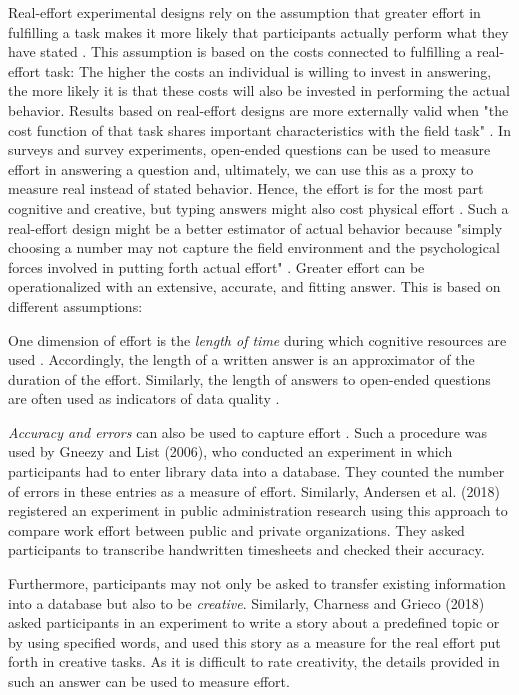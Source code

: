 \documentclass{article}
\begin{document}
Real-effort experimental designs rely on the assumption that greater effort in fulfilling a task makes it more likely that participants actually perform what they have stated \parencite{Dutcher2015}. This assumption is based on the costs connected to fulfilling a real-effort task: The higher the costs an individual is willing to invest in answering, the more likely it is that these costs will also be invested in performing the actual behavior. Results based on real-effort designs are more externally valid when "the cost function of that task shares important characteristics with the field task" \parencite[pp. 3][]{Dutcher2015}. In surveys and survey experiments, open-ended questions can be used to measure effort in answering a question and, ultimately, we can use this as a proxy to measure real instead of stated behavior. Hence, the effort is for the most part cognitive and creative, but typing answers might also cost physical effort \parencite[pp. 75][]{Charness2018}. Such a real-effort design might be a better estimator of actual behavior because "simply choosing a number may not capture the field environment and the psychological forces involved in putting forth actual effort" \parencite[pp. 75][]{Charness2018}. Greater effort can be operationalized with an extensive, accurate, and fitting answer. This is based on different assumptions: 

One dimension of effort is the \emph{length of time} during which cognitive resources are used \parencite{Christensen-Szalanski1980}. Accordingly, the length of a written answer is an approximator of the duration of the effort. Similarly, the length of answers to open-ended questions are often used as indicators of data quality \parencite[pp. 350][]{Galesic2009}. 

\emph{Accuracy and errors} can also be used to capture effort \parencite[pp. 78][]{Charness2018}. Such a procedure was used by Gneezy and List (2006), who conducted an experiment in which participants had to enter library data into a database. They counted the number of errors in these entries as a measure of effort. Similarly, Andersen et al. (2018) registered an experiment in public administration research using this approach to compare work effort between public and private organizations. They asked participants to transcribe handwritten timesheets and checked their accuracy. 

Furthermore, participants may not only be asked to transfer existing information into a database but also to be \emph{creative}. Similarly, Charness and Grieco (2018) asked participants in an experiment to write a story about a predefined topic or by using specified words, and used this story as a measure for the real effort put forth in creative tasks. As it is difficult to rate creativity, the details provided in such an answer can be used to measure effort.
\end{document}
